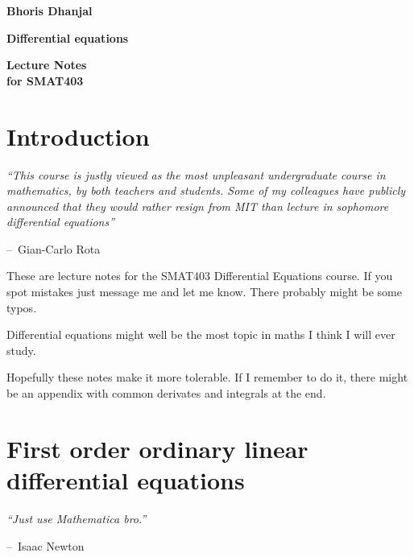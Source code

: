 \documentclass[oneside,11pt,pdftex,final]{book}%
\makeatletter
\numberwithin{equation}{section}
\newenvironment{chapquote}[2][2em]
{\setlength{\@tempdima}{#1}%
	\def\chapquote@author{#2}%
	\parshape 1 \@tempdima \dimexpr\textwidth-2\@tempdima\relax%
	\itshape}
{\par\normalfont\hfill--\ \chapquote@author\hspace*{\@tempdima}\par\bigskip}
\numberwithin{section}{chapter}
\numberwithin{equation}{chapter}
\makeatother
\begin{document}
	
	
	\frontmatter

\thispagestyle{empty}
\begin{flushright}
{\LARGE \textbf{Bhoris Dhanjal}}%
\end{flushright}
\vfill
\begin{center}
{\fontsize{29.86truept}{0truept}\selectfont \textbf{Differential equations}}%
\end{center}
\vfill
\begin{flushleft}
{\LARGE \textbf{Lecture Notes}} \\
\hspace{-1.75truept}
{\large \textbf{for SMAT403}}
\end{flushleft}
\newpage

\tableofcontents


\mainmatter
\chapter*{Introduction}
\begin{chapquote}{Gian-Carlo Rota}
	``This course is justly viewed as the
	most unpleasant undergraduate course in mathematics, by both teachers and students. Some of
	my colleagues have publicly announced that they would rather resign from MIT than lecture in
	sophomore differential equations''
\end{chapquote}
These are lecture notes for the SMAT403 Differential Equations course. If you spot mistakes just message me and let me know. There probably might be some typos.
\par Differential equations might well be the most  topic in maths I think I will ever study. 
\par Hopefully these notes make it more tolerable. If I remember to do it, there might be an appendix with common derivates and integrals at the end.
\chapter{First order ordinary linear differential equations}
\begin{chapquote}{Isaac Newton}
	``Just use Mathematica bro.''
\end{chapquote}
\end{document}
